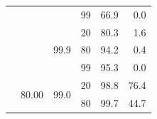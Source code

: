 \documentclass{article}
\begin{document}
\begin{table}
\begin{tabular}{|c|c|c|c|r|r|}
                                    &                                                                                        &                                                                                          & 99                                                                                      & 66.9                                                                      & 0.0                                                                       \\ \cline{3-6} 
                                    &                                                                                        & \multirow{3}{*}{99.9}                                                                    & 20                                                                                      & 80.3                                                                      & 1.6                                                                       \\ \cline{4-6} 
                                    &                                                                                        &                                                                                          & 80                                                                                      & 94.2                                                                      & 0.4                                                                       \\ \cline{4-6} 
                                    &                                                                                        &                                                                                          & 99                                                                                      & 95.3                                                                      & 0.0                                                                       \\ \cline{2-6} 
                                    & \multirow{6}{*}{80.00}                                                                    & \multirow{3}{*}{99.0}                                                                    & 20                                                                                      & 98.8                                                                      & 76.4                                                                      \\ \cline{4-6} 
                                    &                                                                                        &                                                                                          & 80                                                                                      & 99.7                                                                      & 44.7                                                                      \\ \cline{4-6} 

\end{tabular}
\end{table}
\end{document}
